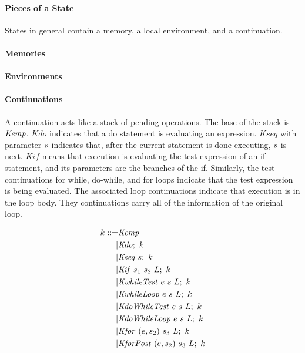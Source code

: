\documentclass{llncs}
\begin{document}
\paragraph*{Pieces of a State}

States in general contain a memory, a local environment, and a continuation.

\paragraph*{Memories}

\paragraph*{Environments}

\paragraph*{Continuations}
\label{app:continuations}

A continuation acts like a stack of pending operations. The base of the stack is
\(\mathit{Kemp}\). \(\mathit{Kdo}\) indicates that a do statement is evaluating an expression.
\(\mathit{Kseq}\) with parameter \(s\) indicates that, after the current statement
is done executing, \(s\) is next. \(\mathit{Kif}\) means that execution is evaluating
the test expression of an if statement, and its parameters are the branches of the
if. Similarly, the test continuations for while, do-while, and for loops indicate that
the test expression is being evaluated. The associated loop continuations indicate that
execution is in the loop body. They continuations carry all of the information of the original
loop.

\[\begin{split}
k ::= & \mathit{Kemp} \\
| & \mathit{Kdo};~ k \\
| & \mathit{Kseq} ~ s; ~ k \\
| & \mathit{Kif} ~ s_1 ~ s_2 ~ L; ~ k \\
| & \mathit{KwhileTest} ~ e ~ s ~ L; ~ k \\
| & \mathit{KwhileLoop} ~ e ~ s ~ L; ~ k \\
| & \mathit{KdoWhileTest} ~ e ~ s ~ L; ~ k \\
| & \mathit{KdoWhileLoop} ~ e ~ s ~ L; ~ k \\
| & \mathit{Kfor} ~ (e,s_2) ~ s_3 ~ L ; ~ k \\
| & \mathit{KforPost} ~ (e,s_2) ~ s_3 ~ L ; ~ k \\
\end{split}\]
\end{document}
